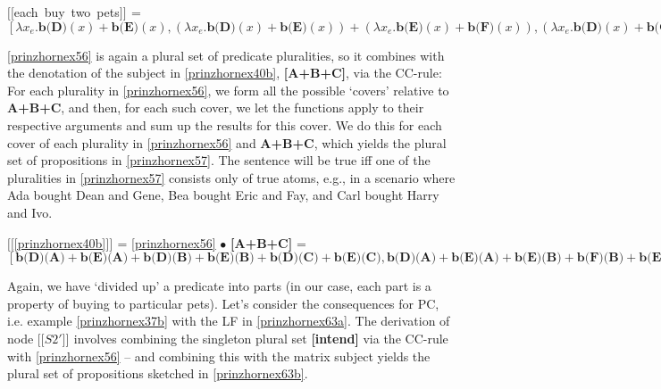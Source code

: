 \documentclass[output=paper,colorlinks,citecolor=brown,
]{langscibook}
\newcommand{\sem}[2]{\mbox{$[\![${#2}$]\!]^{#1}$}} %
\begin{document}
\ea  \sem{}{each buy two pets} = $[\lambda x_{e}. \textbf{b(D)}(x)+ \textbf{b(E)}(x), (\lambda x_{e}.\textbf{b(D)}(x)+\textbf{b(E)}(x))+ (\lambda x_{e}.\textbf{b(E)}(x) +\textbf{b(F)}(x)),  (\lambda x_{e}.\textbf{b(D)}(x)+\textbf{b(G)}(x))+(\lambda x_{e}.\textbf{b(E)}(x)+\textbf{b(F)}(x)) + (\lambda x_{e}. \textbf{b(H)}(x)+\textbf{b(I)}(x)), \dots]$ \label{prinzhornex56} \z

\ref{prinzhornex56} is again a plural set of predicate pluralities, so it combines with the denotation of the subject in \ref{prinzhornex40b}, \textbf{[A+B+C]}, via the CC-rule: For each plurality in \ref{prinzhornex56}, we form all the possible `covers' relative to \textbf{A+B+C}, and then, for each such cover, we let the functions apply to their respective arguments and sum up the results for this cover. We do this for each cover of each plurality in \ref{prinzhornex56} and \textbf{A+B+C}, which yields the plural set of propositions in \ref{prinzhornex57}. The sentence will be true iff one of the pluralities  in \ref{prinzhornex57} consists only of true atoms, e.g., in a scenario where Ada bought Dean and Gene, Bea bought Eric and Fay, and Carl bought Harry and Ivo.


\ea  \sem{}{\ref{prinzhornex40b}} = \ref{prinzhornex56} $\bullet$ \textbf{[A+B+C]} = $[\textbf{b(D)(A)}+\textbf{b(E)(A)}+\textbf{b(D)(B)} +\textbf{b(E)(B)} + \textbf{b(D)(C)} +\textbf{b(E)(C)}, 
\textbf{b(D)(A)}+\textbf{b(E)(A)}+\textbf{b(E)(B)} +\textbf{b(F)(B)} + \textbf{b(E)(C)} +\textbf{b(F)(C)}, 
  \textbf{b(D)(A)}+\textbf{b(G)(A)}+ \textbf{b(E)(B)}+\textbf{b(F)(B)} +  \textbf{b(H)(C)}+\textbf{b(I)(C)}, \dots]$ \label{prinzhornex57} \z


Again, we have `divided up' a predicate into parts (in our case, each part is a property of buying to particular pets). Let's consider the consequences for PC, i.e. example \ref{prinzhornex37b} 
with the LF in \ref{prinzhornex63a}. The derivation of node \sem{}{$S2'$} involves combining the singleton plural set \textbf{[intend]} via the CC-rule with \ref{prinzhornex56} -- and combining this with the matrix subject yields the plural set of propositions sketched in \ref{prinzhornex63b}. 
\end{document}
